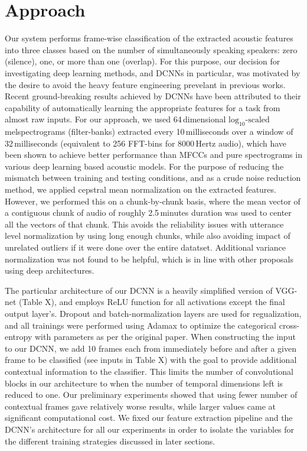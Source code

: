 \documentclass[a4paper]{article}
\begin{document}
\section{Approach}
Our system performs frame-wise classification of the extracted acoustic features into three classes based on the number of simultaneously speaking speakers:
zero (silence), one, or more than one (overlap).
For this purpose, our decision for investigating deep learning methods, and DCNNs in particular,
was motivated by the desire to avoid the heavy feature engineering prevelant in previous works.
Recent ground-breaking results achieved by DCNNs have been attributed to their capability of automatically learning the appropriate features for a task from almost raw inputs.
For our approach, we used 64\,dimensional $\text{log}_{10} \text{-scaled}$ melspectrograms (filter-banks)
extracted every 10\,milliseconds over a window of 32\,milliseconds (equivalent to 256 FFT-bins for 8000\,Hertz audio),
which have been shown to achieve better performance than MFCCs and pure spectrograms in various deep learning based acoustic models.  %
For the purpose of reducing the mismatch between training and testing conditions, and as a crude noise reduction method,
we applied cepstral mean normalization on the extracted features.
However, we performed this on a chunk-by-chunk basis,
where the mean vector of a contiguous chunk of audio of roughly 2.5\,minutes duration was used to center all the vectors of that chunk.
This avoids the reliability issues with utterance level normalization by using long enough chunks,
while also avoiding impact of unrelated outliers if it were done over the entire datatset.
Additional variance normalization was not found to be helpful,
which is in line with other proposals using deep architectures.  %

The particular architecture of our DCNN is a heavily simplified version of VGG-net (Table X),  %
and employs ReLU function for all activations except the final output layer's.
Dropout and batch-normalization layers are used for regualization,
and all trainings were performed using Adamax to optimize the categorical cross-entropy with parameters as per the original paper.  %
When constructing the input to our DCNN, we add 10 frames each from immediately before and after a given frame to be classified (see inputs in Table X)  %
with the goal to provide additional contextual information to the classifier.
This limits the number of convolutional blocks in our architecture to when the number of temporal dimensions left is reduced to one.
Our preliminary experiments showed that using fewer number of contextual frames gave relatively worse results,
while larger values came at significant computational cost.
We fixed our feature extraction pipeline and the DCNN's architecture for all our experiments in order to isolate the variables for the different training strategies discussed in later sections.
\end{document}
